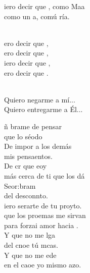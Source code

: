 \documentclass[12pt]{article}
\begin{document}
\begin{multicols*}{2}
\begin{cancion}%
	iero decir que , como Maa  \\
	como  un a, comú ría. \\\jump\\
	\begin{chorus}%
	ero decir que ,  \\
	ero decir que , \\
	iero decir que , \\
	ero decir que . \\
	\end{chorus}%
	\jump\\
Quiero negarme a mí...\\
Quiero entregarme a Él...\\
\end{cancion}%

\begin{cancion}%
	ñ brame de pensar   \\
	que lo séodo\\
	De impor a los demás \\
	mis pensaentos.\\
	De cr que eoy\\
	más cerca de ti que los dá\\
	Seor:bram\\
	del desconnto.   \\
	iero serarte de tu proyto.\\
	que los proemas me sirvan\\
	para forzai amor hacia . \\
	Y que no me lga \\
	del cnoe tú mcas.\\
	Y que no me ede\\
	en el caoe yo mismo azo.\\
\end{cancion}%


\end{multicols*}
\end{document}

